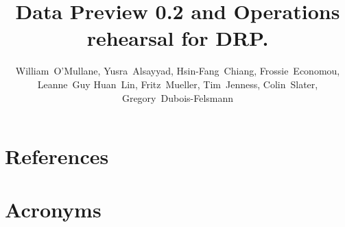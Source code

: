 \documentclass[OPS,lsstdraft,authoryear,toc]{lsstdoc}
\title{Data Preview 0.2 and Operations rehearsal for DRP.}
\author{%
William~O'Mullane,
Yusra~Alsayyad,
Hsin-Fang~Chiang,
Frossie~Economou,
Leanne~Guy
Huan~Lin,
Fritz~Mueller,
Tim~Jenness,
Colin~Slater,
Gregory~Dubois-Felsmann
}
\date{\vcsDate}
\begin{document}
\maketitle


\appendix
\section{References} \label{sec:bib}
\renewcommand{\refname}{} %


\section{Acronyms} \label{sec:acronyms}

\end{document}
